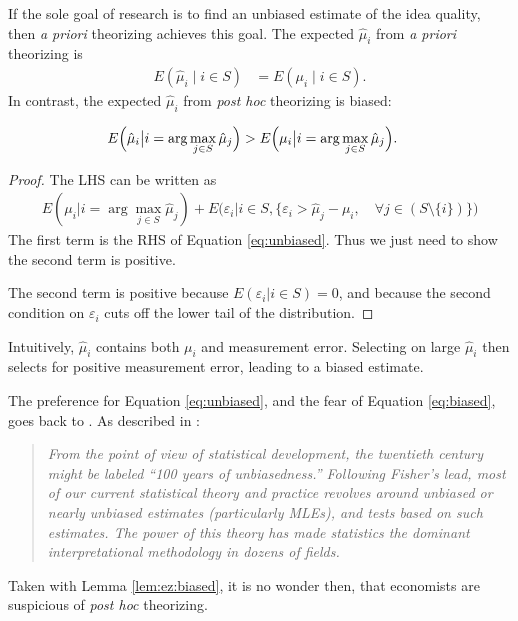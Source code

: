 \documentclass[12pt,english]{article}
\theoremstyle{plain}
\theoremstyle{plain}
\begin{document}
If the sole goal of research is to find an unbiased estimate of the idea quality, then \emph{a priori} theorizing achieves this goal.  The expected $\hat{\mu}_{i}$ from \emph{a priori} theorizing is 
\begin{align}
E\left(\hat{\mu}_{i}\mid i\in S \right) & =E\left(\mu_{i}\mid i\in S \right).
\label{eq:unbiased}
\end{align}
In contrast, the expected $\hat{\mu}_{i}$ from \emph{post hoc} theorizing is biased:
\begin{lemma}\label{lem:ez:biased}
    \begin{align}
        E\Bigl(\hat{\mu}_{i}\big|i=\arg\max_{j\in S }\hat{\mu}_{j}\Bigr) & >E\Bigl(\mu_{i}\big|i=\arg\max_{j\in S }\hat{\mu}_{j}\Bigr).
        \label{eq:biased}
    \end{align}            
\end{lemma}
\begin{proof}
    The LHS can be written as 
    \begin{align*}
        E\left(\mu_i \big| i = \arg\max_{j \in S} \hat{\mu}_j\right) 
        +
        E\bigg(\varepsilon_i
        \big|
        i \in S,
        \{
         \varepsilon_i 
        > \hat{\mu}_j - \mu_i
        , \quad
         \forall j \in \left( S\setminus\{i\}
         \right)
         \}
         \bigg)
    \end{align*}
The first term is the RHS of Equation \eqref{eq:unbiased}. Thus we just need to show the second term is positive.

The second term is positive because $E\left(\varepsilon_i\big| i \in S\right) = 0$, and because the second condition on $\varepsilon_i$  cuts off the lower tail of the distribution.
\end{proof}


Intuitively, $\hat{\mu}_{i}$ contains both $\mu_{i}$ and measurement error. Selecting on large $\hat{\mu}_{i}$ then selects for positive measurement error, leading to a biased estimate.

The preference for Equation \eqref{eq:unbiased}, and the fear of Equation \eqref{eq:biased}, goes back to \citet{fisher1925statistical}. As described in \citet{efron2001statistical}:
\begin{quote}
    \emph{From the point of view of statistical development, the twentieth century might be labeled ``100 years of unbiasedness.'' Following Fisher's lead, most of our current statistical theory and practice revolves around unbiased or nearly unbiased estimates (particularly MLEs), and tests based on such estimates. The power of this theory has made statistics the dominant interpretational methodology in dozens of fields.}
\end{quote}
Taken with Lemma \ref{lem:ez:biased}, it is no wonder then, that economists are suspicious of \emph{post hoc} theorizing.
\end{document}
